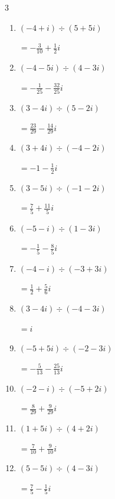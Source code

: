 \begin{multicols}{3}
\begin{enumerate}
  \item $\displaystyle (-4+i)\div(5+5i)$

        $\displaystyle =-\frac{3}{10}+\frac{1}{2}i$

  \item $\displaystyle (-4-5i)\div(4-3i)$

        $\displaystyle =-\frac{1}{25}-\frac{32}{25}i$

  \item $\displaystyle (3-4i)\div(5-2i)$

        $\displaystyle =\frac{23}{29}-\frac{14}{29}i$

  \item $\displaystyle (3+4i)\div(-4-2i)$

        $\displaystyle =-1-\frac{1}{2}i$

  \item $\displaystyle (3-5i)\div(-1-2i)$

        $\displaystyle =\frac{7}{5}+\frac{11}{5}i$

  \item $\displaystyle (-5-i)\div(1-3i)$

        $\displaystyle =-\frac{1}{5}-\frac{8}{5}i$

  \item $\displaystyle (-4-i)\div(-3+3i)$

        $\displaystyle =\frac{1}{2}+\frac{5}{6}i$

\columnbreak %

\resetques

  \item $\displaystyle (3-4i)\div(-4-3i)$

        $\displaystyle =i$

  \item $\displaystyle (-5+5i)\div(-2-3i)$

        $\displaystyle =-\frac{5}{13}-\frac{25}{13}i$

  \item $\displaystyle (-2-i)\div(-5+2i)$

        $\displaystyle =\frac{8}{29}+\frac{9}{29}i$

  \item $\displaystyle (1+5i)\div(4+2i)$

        $\displaystyle =\frac{7}{10}+\frac{9}{10}i$

  \item $\displaystyle (5-5i)\div(4-3i)$

        $\displaystyle =\frac{7}{5}-\frac{1}{5}i$


\end{enumerate}
\end{multicols}
